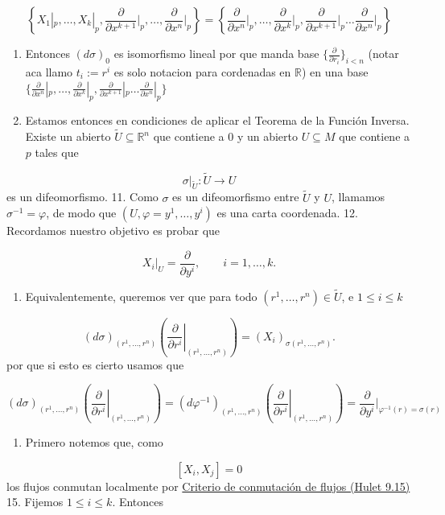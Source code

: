 \begin{bookproof}{}
\[
\left\{ X_{1}|_{p},\ldots,X_{k}|_{p},\frac{\partial}{\partial x^{k+1}}\bigg|_{p},\ldots, \frac{\partial}{\partial x^{n}}|_{p}\right\}=\left\{ \frac{\partial}{\partial x^{n}}\bigg|_{p},\ldots, \frac{\partial}{\partial x^{k}}\bigg|_{p} , \frac{\partial}{\partial x^{k+1}}|_{p}\ldots\frac{\partial}{\partial x^{n}}\bigg|_{p} \right\}
\]
\begin{enumerate}[start=9]
\item Entonces $(d\sigma)_{0}$ es isomorfismo lineal por que manda base $\{ \frac{\partial}{\partial r_{i}} \}_{i<n}$ (notar aca llamo $t_{i}:=r^{i}$ es solo notacion para cordenadas en $\mathbb{R}$) en una base $\{ \frac{\partial}{\partial x^{n}}|_{p},\ldots, \frac{\partial}{\partial x^{k}}|_{p} , \frac{\partial}{\partial x^{k+1}}|_{p}\ldots\frac{\partial}{\partial x^{n}}|_{p} \}$
\item Estamos entonces en condiciones de aplicar el Teorema de la Función Inversa. Existe un abierto $\widetilde U\subseteq\mathbb{R}^n$ que contiene a $0$ y un abierto $U\subseteq M$ que contiene a $p$ tales que
\end{enumerate}
\[
\sigma|_{\widetilde U}:\widetilde U\longrightarrow U
\]
es un difeomorfismo. 11. Como $\sigma$ es un difeomorfismo entre $\widetilde U$ y $U$, llamamos $\sigma^{-1}=\varphi$, de modo que $(U,\varphi=y^{1},\ldots,y^{i})$ es una carta coordenada. 12. Recordamos nuestro objetivo es probar que

\[
X_i|_U=\frac{\partial}{\partial y^i},\qquad i=1,\ldots,k.
\]
\begin{enumerate}[start=13]
\item Equivalentemente, queremos ver que para todo $(r^1,\ldots,r^n)\in\widetilde U$, e $1\leq i\leq k$
\end{enumerate}
\[
(d\sigma)_{(r^1,\ldots,r^n)}\left(\left.\frac{\partial}{\partial r^i}\right|_{(r^1,\ldots,r^n)}\right)=(X_i)_{\sigma(r^1,\ldots,r^n)}.
\]
por que si esto es cierto usamos que

\[
(d\sigma)_{(r^1,\ldots,r^n)}\left(\left.\frac{\partial}{\partial r^i}\right|_{(r^1,\ldots,r^n)}\right)=(d\varphi ^{-1})_{(r^1,\ldots,r^n)}\left(\left.\frac{\partial}{\partial r^i}\right|_{(r^1,\ldots,r^n)}\right)=\frac{\partial}{\partial y^{i} }\bigg|_{\varphi ^{-1}(r)=\sigma(r)}
\]
\begin{enumerate}[start=14]
\item Primero notemos que, como
\end{enumerate}
\[
[X_i,X_j]=0
\]
los flujos conmutan localmente por \hyperref[blk:26db5d]{Criterio de conmutación de flujos (Hulet 9.15)} 15. Fijemos $1\leq i\leq k$. Entonces


\end{bookproof}
